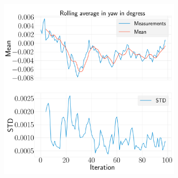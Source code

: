 \documentclass[../Head/report.tex]{subfiles}
\begin{document}
\begin{figure}[H]
\begin{subfigure}[t]{.30\textwidth}
        \caption{}
        \label{fig:rolling_average_in_pitch_test1}
    \end{subfigure}
     \hspace{0.2em}
    \begin{subfigure}[t]{.30\textwidth}
        \centering
        \includegraphics[width=\textwidth]{../Figures/analyse_rolling_average/test1/Calculated_rolling_average_in_yaw_with_mean_and_STD.png}
        \caption{}
        \label{fig:rolling_average_in_yaw_test1}
    \end{subfigure}
    \caption{}
    \label{fig:rolling_average_angle_test1}
\end{figure}
\end{document}
